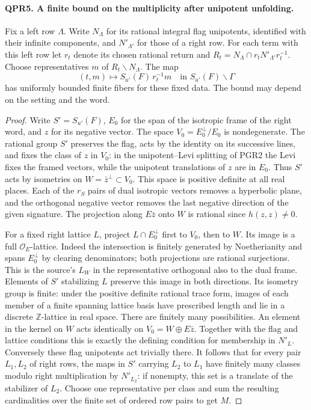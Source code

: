\paragraph{QPR5. A finite bound on the multiplicity after unipotent unfolding.}
Fix a left row \(\Lambda\). Write \(N_\Lambda\) for its rational
integral flag unipotents, identified with their infinite components,
and \(N'_{\Lambda'}\) for those of a right row. For each term with
this left row let \(r_t\) denote its chosen rational return and
\(R_t=N_\Lambda\cap r_t N'_{\Lambda'}r_t^{-1}\).
Choose representatives \(m\) of \(R_t\backslash N_\Lambda\).
The map
\[
 (t,m)\longmapsto S_{u'}(F)\,r_t^{-1}m
          \quad\text{in } S_{u'}(F)\backslash\Gamma
\]
has uniformly bounded finite fibers for these fixed data. The bound
may depend on the setting and the word.
\begin{proof}
Write \(S'=S_{u'}(F)\), \(E_0\) for the span of the isotropic
frame of the right word, and \(z\) for its negative vector. The
space \(V_0=E_0^\perp/E_0\) is nondegenerate. The rational group
\(S'\) preserves the flag, acts by the identity on its successive
lines, and fixes the class of \(z\) in \(V_0\): in the unipotent--Levi
splitting of PGR2 the Levi fixes the framed vectors, while the
unipotent translations of \(z\) are in \(E_0\). Thus \(S'\) acts
by isometries on \(W=\bar z^\perp\subset V_0\). This space is
positive definite at all real places. Each of the \(r_S\) pairs of
dual isotropic vectors removes a hyperbolic plane, and the orthogonal
negative vector removes the last negative direction of the given
signature. The projection along \(E\bar z\) onto \(W\) is rational
since \(h(z,z)\ne0\).

For a fixed right lattice \(L\), project \(L\cap E_0^\perp\) first
to \(V_0\), then to \(W\). Its image is a full
\(\mathcal O_E\)-lattice. Indeed the intersection is finitely
generated by Noetherianity and spans \(E_0^\perp\) by clearing
denominators; both projections are rational surjections. This is
the source's \(L_W\) in the representative orthogonal also to the
dual frame. Elements of \(S'\) stabilizing \(L\) preserve this
image in both directions. Its isometry group is finite: under the
positive definite rational trace form, images of each member of a
finite spanning lattice basis have prescribed length and lie in a
discrete \(\mathbb Z\)-lattice in real space. There are finitely many
possibilities. An element in the kernel on \(W\) acts identically
on \(V_0=W\oplus E\bar z\). Together with the flag and lattice
conditions this is exactly the defining condition for membership in
\(N'_L\). Conversely these flag unipotents act trivially there.
It follows that for every pair \(L_1,L_2\) of right rows, the maps
in \(S'\) carrying \(L_2\) to \(L_1\) have finitely many classes
modulo right multiplication by \(N'_{L_2}\): if nonempty, this set
is a translate of the stabilizer of \(L_2\). Choose one representative
per class and sum the resulting cardinalities over the finite set of
ordered row pairs to get \(M\).


\end{proof}
